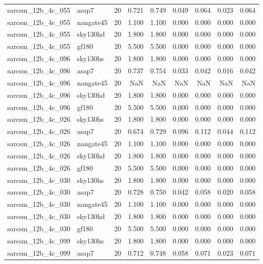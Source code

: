 \begin{tabular}{llrrrrrrr}
sarcsm\_12b\_4c\_055 & asap7 & 20 & 0.721 & 0.749 & 0.049 & 0.064 & 0.023 & 0.064 \\
sarcsm\_12b\_4c\_055 & nangate45 & 20 & 1.100 & 1.100 & 0.000 & 0.000 & 0.000 & 0.000 \\
sarcsm\_12b\_4c\_055 & sky130hd & 20 & 1.800 & 1.800 & 0.000 & 0.000 & 0.000 & 0.000 \\
sarcsm\_12b\_4c\_055 & gf180 & 20 & 5.500 & 5.500 & 0.000 & 0.000 & 0.000 & 0.000 \\
sarcsm\_12b\_4c\_096 & sky130hs & 20 & 1.800 & 1.800 & 0.000 & 0.000 & 0.000 & 0.000 \\
sarcsm\_12b\_4c\_096 & asap7 & 20 & 0.737 & 0.754 & 0.033 & 0.042 & 0.016 & 0.042 \\
sarcsm\_12b\_4c\_096 & nangate45 & 20 & NaN & NaN & NaN & NaN & NaN & NaN \\
sarcsm\_12b\_4c\_096 & sky130hd & 20 & 1.800 & 1.800 & 0.000 & 0.000 & 0.000 & 0.000 \\
sarcsm\_12b\_4c\_096 & gf180 & 20 & 5.500 & 5.500 & 0.000 & 0.000 & 0.000 & 0.000 \\
sarcsm\_12b\_4c\_026 & sky130hs & 20 & 1.800 & 1.800 & 0.000 & 0.000 & 0.000 & 0.000 \\
sarcsm\_12b\_4c\_026 & asap7 & 20 & 0.674 & 0.729 & 0.096 & 0.112 & 0.044 & 0.112 \\
sarcsm\_12b\_4c\_026 & nangate45 & 20 & 1.100 & 1.100 & 0.000 & 0.000 & 0.000 & 0.000 \\
sarcsm\_12b\_4c\_026 & sky130hd & 20 & 1.800 & 1.800 & 0.000 & 0.000 & 0.000 & 0.000 \\
sarcsm\_12b\_4c\_026 & gf180 & 20 & 5.500 & 5.500 & 0.000 & 0.000 & 0.000 & 0.000 \\
sarcsm\_12b\_4c\_030 & sky130hs & 20 & 1.800 & 1.800 & 0.000 & 0.000 & 0.000 & 0.000 \\
sarcsm\_12b\_4c\_030 & asap7 & 20 & 0.728 & 0.750 & 0.042 & 0.058 & 0.020 & 0.058 \\
sarcsm\_12b\_4c\_030 & nangate45 & 20 & 1.100 & 1.100 & 0.000 & 0.000 & 0.000 & 0.000 \\
sarcsm\_12b\_4c\_030 & sky130hd & 20 & 1.800 & 1.800 & 0.000 & 0.000 & 0.000 & 0.000 \\
sarcsm\_12b\_4c\_030 & gf180 & 20 & 5.500 & 5.500 & 0.000 & 0.000 & 0.000 & 0.000 \\
sarcsm\_12b\_4c\_099 & sky130hs & 20 & 1.800 & 1.800 & 0.000 & 0.000 & 0.000 & 0.000 \\
sarcsm\_12b\_4c\_099 & asap7 & 20 & 0.712 & 0.748 & 0.058 & 0.071 & 0.023 & 0.071 \\

\end{tabular}
